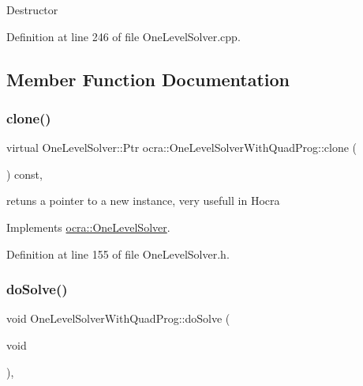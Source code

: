 Destructor 

Definition at line 246 of file One\+Level\+Solver.\+cpp.



\subsection{Member Function Documentation}
\hypertarget{classocra_1_1OneLevelSolverWithQuadProg_a706e7772885ae7ab3e78565d51286eac}{}\label{classocra_1_1OneLevelSolverWithQuadProg_a706e7772885ae7ab3e78565d51286eac} 
\subsubsection{\texorpdfstring{clone()}{clone()}}
{\footnotesize\ttfamily virtual One\+Level\+Solver\+::\+Ptr ocra\+::\+One\+Level\+Solver\+With\+Quad\+Prog\+::clone (\begin{DoxyParamCaption}{ }\end{DoxyParamCaption}) const\hspace{0.3cm}{\ttfamily [inline]}, {\ttfamily [virtual]}}

retuns a pointer to a new instance, very usefull in Hocra 

Implements \hyperlink{classocra_1_1OneLevelSolver_a08ecd92d4295e03aa03075a71d481f48}{ocra\+::\+One\+Level\+Solver}.



Definition at line 155 of file One\+Level\+Solver.\+h.

\hypertarget{classocra_1_1OneLevelSolverWithQuadProg_aa6e7517459ef68106e83a7f0dc09c977}{}\label{classocra_1_1OneLevelSolverWithQuadProg_aa6e7517459ef68106e83a7f0dc09c977} 
\subsubsection{\texorpdfstring{do\+Solve()}{doSolve()}}
{\footnotesize\ttfamily void One\+Level\+Solver\+With\+Quad\+Prog\+::do\+Solve (\begin{DoxyParamCaption}\item[{void}]{ }\end{DoxyParamCaption})\hspace{0.3cm}{\ttfamily [protected]}, {\ttfamily [virtual]}}

